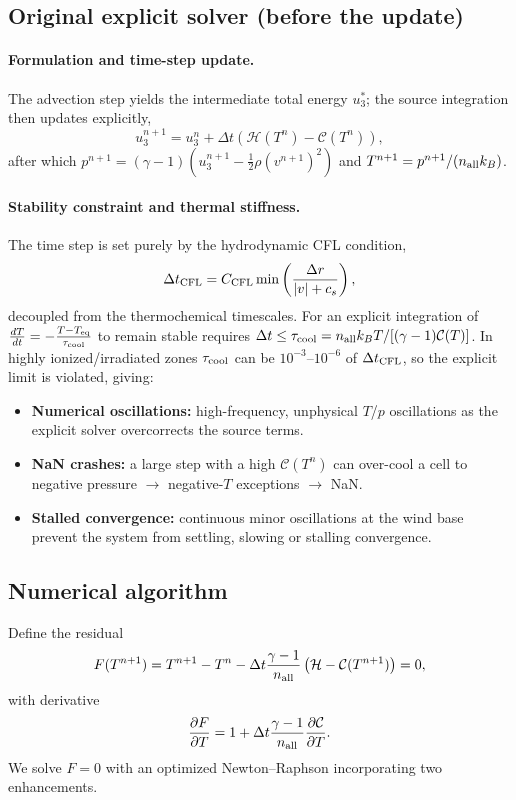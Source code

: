 \documentclass[english,a4paper]{my_memo}
\begin{document}
\subsection{Original explicit solver (before the update)}
\paragraph{Formulation and time-step update.} The advection step yields the
intermediate total energy $u_3^*$; the source integration then updates explicitly,
\begin{equation}
  u^{n+1}_3 = u^n_3 + \Delta t \left( \mathcal{H}(T^n) - \mathcal{C}(T^n) \right),
\end{equation}
after which $p^{n+1}=(\gamma-1)(u_3^{n+1}-\tfrac12\rho (v^{n+1})^2)$ and
$T^{n+1}=p^{n+1}/(n_{\rm all}k_B)$.

\paragraph{Stability constraint and thermal stiffness.} The time step is set purely
by the hydrodynamic CFL condition,
\begin{equation}
  \Delta t_{\rm CFL} = C_{\rm CFL} \min \left( \frac{\Delta r}{|v| + c_s} \right),
\end{equation}
decoupled from the thermochemical timescales. For an explicit integration of
$\frac{dT}{dt} = -\frac{T - T_{\rm eq}}{\tau_{\rm cool}}$ to remain stable requires
$\Delta t \le \tau_{\rm cool} = n_{\rm all} k_B T / [(\gamma-1)\mathcal{C}(T)]$.
In highly ionized/irradiated zones $\tau_{\rm cool}$ can be $10^{-3}$--$10^{-6}$
of $\Delta t_{\rm CFL}$, so the explicit limit is violated, giving:
\begin{itemize}
  \item \textbf{Numerical oscillations:} high-frequency, unphysical $T$/$p$
    oscillations as the explicit solver overcorrects the source terms.
  \item \textbf{NaN crashes:} a large step with a high $\mathcal{C}(T^n)$ can
    over-cool a cell to negative pressure $\to$ negative-$T$ exceptions $\to$ NaN.
  \item \textbf{Stalled convergence:} continuous minor oscillations at the wind
    base prevent the system from settling, slowing or stalling convergence.
\end{itemize}

\subsection{Numerical algorithm}
Define the residual
\begin{equation}
  F(T^{n+1}) = T^{n+1} - T^n - \Delta t \frac{\gamma - 1}{n_{\rm all}} \left( \mathcal{H} - \mathcal{C}(T^{n+1}) \right) = 0,
\end{equation}
with derivative
\begin{equation}
  \frac{\partial F}{\partial T} = 1 + \Delta t \frac{\gamma - 1}{n_{\rm all}} \frac{\partial \mathcal{C}}{\partial T}.
\end{equation}
We solve $F=0$ with an optimized Newton--Raphson incorporating two enhancements.
\end{document}
